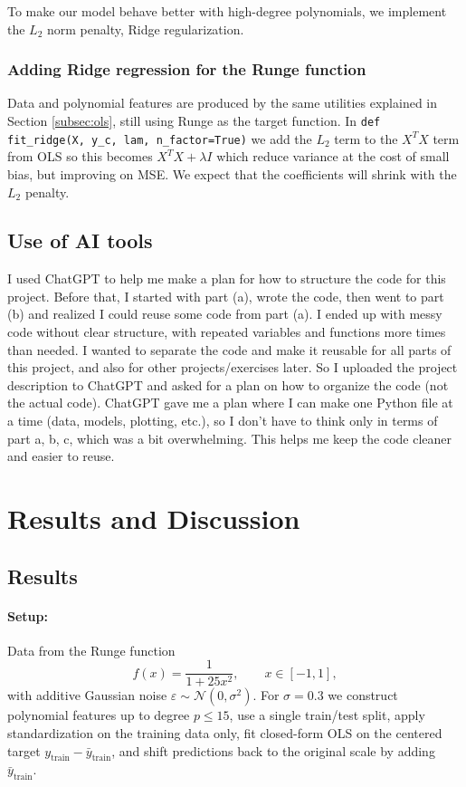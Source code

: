 \documentclass[amssymb,twocolumn,aps]{revtex4-2}
\begin{document}
To make our model behave better with high-degree polynomials, we implement the $L_2$ norm penalty, Ridge regularization. \\

\subsubsection{Adding Ridge regression for the Runge function}

Data and polynomial features are produced by the same utilities explained in Section \ref{subsec:ols}, still using Runge as the target function. In \texttt{def fit\_ridge(X, y\_c, lam, n\_factor=True)} we add the $L_2$ term to the $X^TX$ term from OLS so this becomes $X^TX + \lambda I$ which reduce variance at the cost of small bias, but improving on MSE. We expect that the coefficients will shrink with the $L_2$ penalty. 

\subsection{Use of AI tools}
	
I used ChatGPT to help me make a plan for how to structure the code for this project. Before that, I started with part (a), wrote the code, then went to part (b) and realized I could reuse some code from part (a). I ended up with messy code without clear structure, with repeated variables and functions more times than needed. I wanted to separate the code and make it reusable for all parts of this project, and also for other projects/exercises later. So I uploaded the project description to ChatGPT and asked for a plan on how to organize the code (not the actual code). ChatGPT gave me a plan where I can make one Python file at a time (data, models, plotting, etc.), so I don’t have to think only in terms of part a, b, c, which was a bit overwhelming. This helps me keep the code cleaner and easier to reuse. \\
	
\section{Results and Discussion}\label{section:results} 

\subsection{Results}

\paragraph{Setup:}
Data from the Runge function
\[
f(x)=\frac{1}{1+25x^{2}}, \qquad x\in[-1,1],
\]
with additive Gaussian noise \(\varepsilon\sim\mathcal N(0,\sigma^{2})\).
For $\sigma = 0.3$  we construct polynomial features up to
degree \(p\le 15\), use a single train/test split, apply standardization
on the training data only, fit closed-form OLS on the centered target
\(y_{\text{train}}-\bar y_{\text{train}}\), and shift predictions back to the
original scale by adding \(\bar y_{\text{train}}\).
\end{document}
